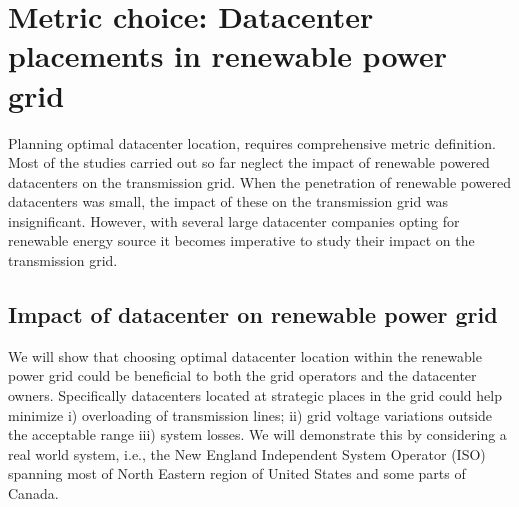 \section{Metric choice: Datacenter placements in renewable power grid}
\label{sec:quantify}
Planning optimal datacenter location, requires comprehensive metric definition. Most of the studies carried out so far neglect the impact of renewable powered datacenters on the transmission grid. When the penetration of renewable powered datacenters was small, the impact of these on the transmission grid was insignificant. However, with several large datacenter companies opting for renewable energy source it becomes imperative to study their impact on the transmission grid.

\subsection{Impact of datacenter on renewable power grid}
\label{sec:metrics}
We will show that choosing optimal datacenter location within the renewable power grid could be beneficial to both the grid operators and the datacenter owners. Specifically datacenters located at strategic places in the grid could help minimize i) overloading of transmission lines; ii) grid voltage variations outside the acceptable range iii) system losses. We will demonstrate this by considering a real world system, i.e., the New England Independent System Operator (ISO) spanning most of North Eastern region of United States and some parts of Canada.
